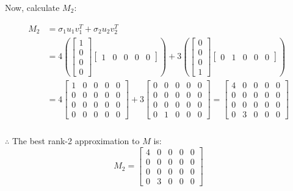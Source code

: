 \documentclass{article}
\begin{document}
{\begin{flushleft}
  Now, calculate $M_2$:
\end{flushleft}
 
\begin{align*}
  M_2 &= \sigma_1 u_1 v_1^T + \sigma_2 u_2 v_2^T \\
  &= 4 \left( \begin{bmatrix} 1 \\ 0 \\ 0 \\ 0 \end{bmatrix} \begin{bmatrix} 1 & 0 & 0 & 0 & 0 \end{bmatrix} \right) + 3 \left( \begin{bmatrix} 0 \\ 0 \\ 0 \\ 1 \end{bmatrix} \begin{bmatrix} 0 & 1 & 0 & 0 & 0 \end{bmatrix} \right) \\
    &= 4 \begin{bmatrix}
        1 & 0 & 0 & 0 & 0 \\
        0 & 0 & 0 & 0 & 0 \\
        0 & 0 & 0 & 0 & 0 \\
        0 & 0 & 0 & 0 & 0
        \end{bmatrix} + 3 \begin{bmatrix}
        0 & 0 & 0 & 0 & 0 \\
        0 & 0 & 0 & 0 & 0 \\
        0 & 0 & 0 & 0 & 0 \\
        0 & 1 & 0 & 0 & 0
        \end{bmatrix} 
    = \begin{bmatrix}
        4 & 0 & 0 & 0 & 0 \\
        0 & 0 & 0 & 0 & 0 \\
        0 & 0 & 0 & 0 & 0 \\
        0 & 3 & 0 & 0 & 0
        \end{bmatrix}
\end{align*}

\subsubsection*{\normalfont}{$\therefore$ The best rank-2 approximation to $M$ is:}
\[
M_2 = \begin{bmatrix}
    4 & 0 & 0 & 0 & 0 \\
    0 & 0 & 0 & 0 & 0 \\
    0 & 0 & 0 & 0 & 0 \\
    0 & 3 & 0 & 0 & 0
    \end{bmatrix}
\]

}
\end{document}
